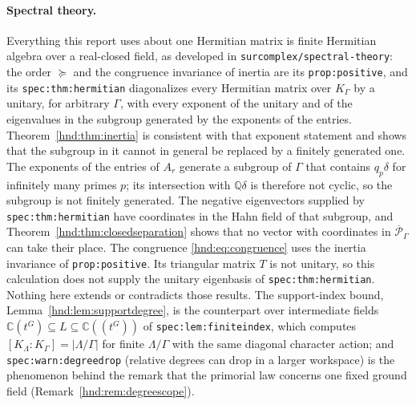 \documentclass[11pt,oneside]{article}
\theoremstyle{definition}
\theoremstyle{remark}
\newcommand{\C}{\mathbb C}
\newcommand{\Q}{\mathbb Q}
\newcommand{\repo}[1]{\nolinkurl{#1}}%
\newcommand{\lbl}[1]{\nolinkurl{#1}}%
\begin{document}
\paragraph{Spectral theory.} Everything this report uses about one
Hermitian matrix is finite Hermitian algebra over a real-closed field, as
developed in \repo{surcomplex/spectral-theory}: the order $\succeq$ and the
congruence invariance of inertia are its \lbl{prop:positive}, and its
\lbl{spec:thm:hermitian} diagonalizes every Hermitian matrix over
$K_\Gamma$ by a unitary, for arbitrary $\Gamma$, with every exponent of the
unitary and of the eigenvalues in the subgroup generated by the exponents
of the entries. Theorem~\ref{hnd:thm:inertia} is consistent with that
exponent statement and shows that the subgroup in it cannot in general be
replaced by a finitely generated one. The exponents
of the entries of $A_r$ generate a subgroup of $\Gamma$ that contains
$q_p\delta$ for infinitely many primes $p$; its intersection with $\Q\delta$
is therefore not cyclic, so the subgroup is not finitely generated. The
negative eigenvectors supplied by \lbl{spec:thm:hermitian} have coordinates
in the Hahn field of that subgroup, and
Theorem~\ref{hnd:thm:closedseparation} shows that no vector with
coordinates in $\overline{\mathscr P}_\Gamma$ can take their place. The
congruence \eqref{hnd:eq:congruence} uses the inertia invariance of
\lbl{prop:positive}. Its triangular matrix $T$ is not unitary, so this
calculation does not supply the unitary eigenbasis of
\lbl{spec:thm:hermitian}. Nothing here extends or contradicts those results. The support-index bound,
Lemma~\ref{hnd:lem:supportdegree}, is the counterpart over intermediate
fields $\C(t^G)\subseteq L\subseteq\C((t^G))$ of \lbl{spec:lem:finiteindex},
which computes $[K_\Lambda:K_\Gamma]=|\Lambda/\Gamma|$ for finite
$\Lambda/\Gamma$ with the same diagonal character action; and
\lbl{spec:warn:degreedrop} (relative degrees can drop in a larger
workspace) is the phenomenon behind the remark that the primorial law
concerns one fixed ground field (Remark~\ref{hnd:rem:degreescope}).
\end{document}
